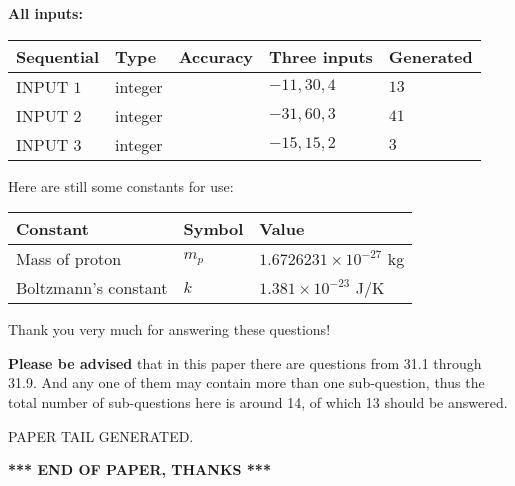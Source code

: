\documentclass[12pt]{article}
\begin{document}
   
   
   
\noindent\vspace{0.1in}\hspace{-0.08in} {\textbf{\Large{All inputs: }}}
   
   
  
  
\noindent\begin{tabular}{|l|l|l|l|l|}
\hline
 Sequential & Type & Accuracy & Three inputs & Generated \\ 
\hline
 
 
  INPUT $            1 $ & integer &  & $
 -11
 , 
 30
 , 
 4
 $ & $ 13 $ 
 \\  \hline  
 
 
  INPUT $            2 $ & integer &  & $
 -31
 , 
 60
 , 
 3
 $ & $ 41 $ 
 \\  \hline  
 
 
  INPUT $            3 $ & integer &  & $
 -15
 , 
 15
 , 
 2
 $ & $ 3 $ 
 \\  \hline  
 \end{tabular}
   
   
   
   
   
   
 \vspace{0.2in}
Here are still some constants for use:
 
 
\noindent\begin{tabular}{|l|l|l|}
\hline
Constant & Symbol & Value \\
\hline
 
Mass of proton &
$m_p$ &
 $ 1.6726231 \times 10^{-27} $
kg \\
\hline
 
Boltzmann's constant &
$k$ &
 $ 1.381 \times 10^{-23} $
J/K \\
\hline
 
\end{tabular}
 
Thank you very much for answering these questions!
 
{\textbf{\large{Please be advised}}} that in this paper there are questions from
31.1 through
31.9.
And any one of them may contain more than one sub-question, thus the total number
of sub-questions here is around 14, of which
13 should be answered.
 
   
   
\vspace{2.0in} PAPER TAIL GENERATED.
   
   
   
   
\vspace{1.0in} 
{\textbf{\large{ *** END OF PAPER, THANKS *** }}} 
   
\end{document}
